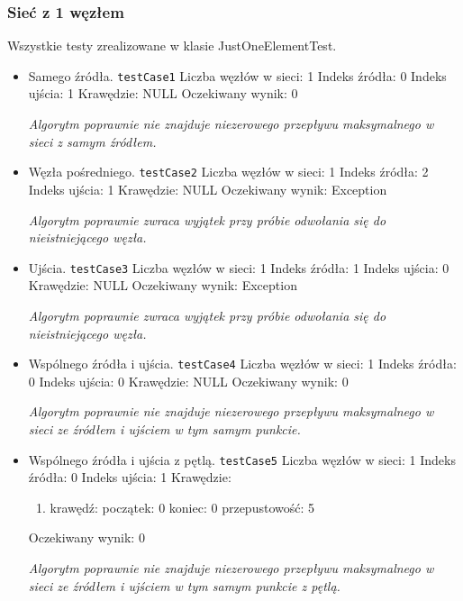 \subsubsection{Sieć z 1 węzłem}
Wszystkie testy zrealizowane w klasie JustOneElementTest.
\begin{itemize}[nosep]
    \item Samego źródła.
    \texttt{testCase1}
    Liczba węzłów w sieci: 1
    Indeks źródła: 0
    Indeks ujścia: 1
    Krawędzie: NULL
    Oczekiwany wynik: 0

    \emph{Algorytm poprawnie nie znajduje niezerowego przepływu maksymalnego w sieci
    z samym źródłem.}

    \item Węzła pośredniego.
    \texttt{testCase2}
    Liczba węzłów w sieci: 1
    Indeks źródła: 2
    Indeks ujścia: 1
    Krawędzie: NULL
    Oczekiwany wynik: Exception

    \emph{Algorytm poprawnie zwraca wyjątek przy próbie odwołania się
    do nieistniejącego węzła.}

    \item Ujścia.
    \texttt{testCase3}
    Liczba węzłów w sieci: 1
    Indeks źródła: 1
    Indeks ujścia: 0
    Krawędzie: NULL
    Oczekiwany wynik: Exception

    \emph{Algorytm poprawnie zwraca wyjątek przy próbie odwołania się
    do nieistniejącego węzła.}

    \item Wspólnego źródła i ujścia.
    \texttt{testCase4}
    Liczba węzłów w sieci: 1
    Indeks źródła: 0
    Indeks ujścia: 0
    Krawędzie: NULL
    Oczekiwany wynik: 0

    \emph{Algorytm poprawnie nie znajduje niezerowego
    przepływu maksymalnego w sieci ze źródłem i ujściem w tym samym punkcie.}

    \item Wspólnego źródła i ujścia z pętlą.
    \texttt{testCase5}
    Liczba węzłów w sieci: 1
    Indeks źródła: 0
    Indeks ujścia: 1
    Krawędzie:
    \begin{enumerate}[nosep]
        \item krawędź:
        początek: 0
        koniec: 0
        przepustowość: 5
    \end{enumerate}
    Oczekiwany wynik: 0

    \emph{Algorytm poprawnie nie znajduje niezerowego
    przepływu maksymalnego w sieci ze źródłem i ujściem w tym samym punkcie z pętlą.}
\end{itemize}


